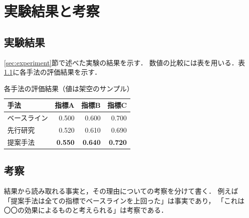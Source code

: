 \documentclass[main]{subfiles}
\begin{document}
\chapter{実験結果と考察}
\label{chap:result}
\section{実験結果}
\ref{sec:experiment}節で述べた実験の結果を示す．
数値の比較には表を用いる．表\ref{table:result}に各手法の評価結果を示す．

\begin{table}[htbp]
  \centering
  \caption{各手法の評価結果（値は架空のサンプル）}
  \label{table:result}
  \begin{tabular}{lrrr}
    \toprule
    手法       & 指標A          & 指標B          & 指標C          \\
    \midrule
    ベースライン & 0.500          & 0.600          & 0.700          \\
    先行研究   & 0.520          & 0.610          & 0.690          \\
    提案手法   & \textbf{0.550} & \textbf{0.640} & \textbf{0.720} \\
    \bottomrule
  \end{tabular}
\end{table}

\section{考察}
結果から読み取れる事実と，その理由についての考察を分けて書く．
例えば「提案手法は全ての指標でベースラインを上回った」は事実であり，
「これは〇〇の効果によるものと考えられる」は考察である．
\end{document}
